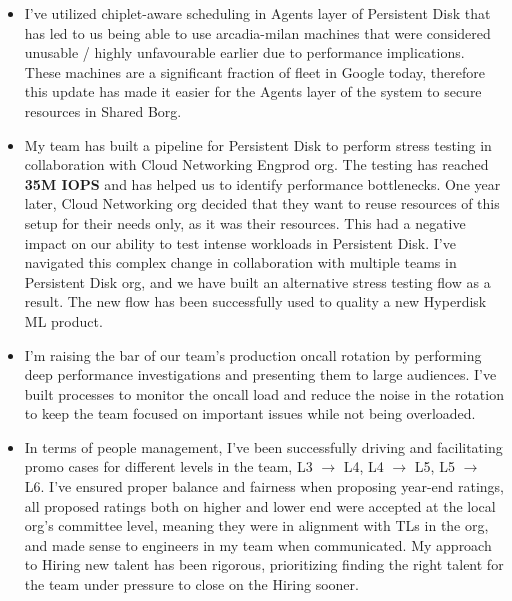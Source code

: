 \documentclass[10pt,a4paper,sans]{moderncv}
\begin{document}
{\begin{itemize}
		\item I've utilized chiplet-aware scheduling in Agents layer of Persistent Disk that has led to us being able to use arcadia-milan machines that were considered unusable / highly unfavourable earlier due to performance implications. These machines are a significant fraction of fleet in Google today, therefore this update has made it easier for the Agents layer of the system to secure resources in Shared Borg.
		\item My team has built a pipeline for Persistent Disk to perform stress testing in collaboration with Cloud Networking Engprod org. The testing has reached \textbf{35M IOPS} and has helped us to identify performance bottlenecks. One year later, Cloud Networking org decided that they want to reuse resources of this setup for their needs only, as it was their resources. This had a negative impact on our ability to test intense workloads in Persistent Disk. I've navigated this complex change in collaboration with multiple teams in Persistent Disk org, and we have built an alternative stress testing flow as a result. The new flow has been successfully used to quality a new Hyperdisk ML product.
		\item I'm raising the bar of our team's production oncall rotation by performing deep performance investigations and presenting them to large audiences. I've built processes to monitor the oncall load and reduce the noise in the rotation to keep the team focused on important issues while not being overloaded.
		\item In terms of people management, I've been successfully driving and facilitating promo cases for different levels in the team, L3 $\rightarrow$ L4, L4 $\rightarrow$ L5, L5 $\rightarrow$ L6. I've ensured proper balance and fairness when proposing year-end ratings, all proposed ratings both on higher and lower end were accepted at the local org's committee level, meaning they were in alignment with TLs in the org, and made sense to engineers in my team when communicated. My approach to Hiring new talent has been rigorous, prioritizing finding the right talent for the team under pressure to close on the Hiring sooner.
	\end{itemize}
}
\end{document}
